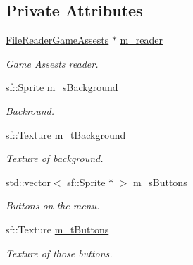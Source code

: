 \subsection*{Private Attributes}
\begin{DoxyCompactItemize}
\item 
\mbox{\label{class_menu_one_adc87ccaf60520d5eff34b4132e09a9e4}} 
\mbox{\hyperlink{class_file_reader_game_assests}{File\+Reader\+Game\+Assests}} $\ast$ \mbox{\hyperlink{class_menu_one_adc87ccaf60520d5eff34b4132e09a9e4}{m\+\_\+reader}}
\begin{DoxyCompactList}\small\item\em Game Assests reader. \end{DoxyCompactList}\item 
\mbox{\label{class_menu_one_a7d04616d482ed54b3f84b6f9e3b4de09}} 
sf\+::\+Sprite \mbox{\hyperlink{class_menu_one_a7d04616d482ed54b3f84b6f9e3b4de09}{m\+\_\+s\+Background}}
\begin{DoxyCompactList}\small\item\em Backround. \end{DoxyCompactList}\item 
\mbox{\label{class_menu_one_a53ba11130fd8062dfbf49bbea7726266}} 
sf\+::\+Texture \mbox{\hyperlink{class_menu_one_a53ba11130fd8062dfbf49bbea7726266}{m\+\_\+t\+Background}}
\begin{DoxyCompactList}\small\item\em Texture of background. \end{DoxyCompactList}\item 
\mbox{\label{class_menu_one_a4d39bd33df8d3fcbf177ff096f6ff453}} 
std\+::vector$<$ sf\+::\+Sprite $\ast$ $>$ \mbox{\hyperlink{class_menu_one_a4d39bd33df8d3fcbf177ff096f6ff453}{m\+\_\+s\+Buttons}}
\begin{DoxyCompactList}\small\item\em Buttons on the menu. \end{DoxyCompactList}\item 
\mbox{\label{class_menu_one_af8eb4784fa6e62496705c89e9aab7d86}} 
sf\+::\+Texture \mbox{\hyperlink{class_menu_one_af8eb4784fa6e62496705c89e9aab7d86}{m\+\_\+t\+Buttons}}
\begin{DoxyCompactList}\small\item\em Texture of those buttons. \end{DoxyCompactList}\item 

\end{DoxyCompactItemize}
